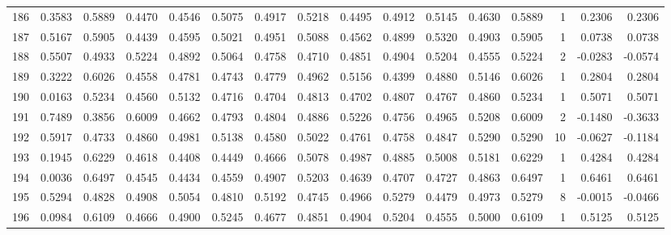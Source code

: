 \begin{tabular}{lrrrrrrrrrrrrrrr}
186 &      0.3583 &  0.5889 &  0.4470 &  0.4546 &  0.5075 &  0.4917 &  0.5218 &  0.4495 &  0.4912 &  0.5145 &   0.4630 &     0.5889 &      1 &                    0.2306 &                     0.2306 \\
187 &      0.5167 &  0.5905 &  0.4439 &  0.4595 &  0.5021 &  0.4951 &  0.5088 &  0.4562 &  0.4899 &  0.5320 &   0.4903 &     0.5905 &      1 &                    0.0738 &                     0.0738 \\
188 &      0.5507 &  0.4933 &  0.5224 &  0.4892 &  0.5064 &  0.4758 &  0.4710 &  0.4851 &  0.4904 &  0.5204 &   0.4555 &     0.5224 &      2 &                   -0.0283 &                    -0.0574 \\
189 &      0.3222 &  0.6026 &  0.4558 &  0.4781 &  0.4743 &  0.4779 &  0.4962 &  0.5156 &  0.4399 &  0.4880 &   0.5146 &     0.6026 &      1 &                    0.2804 &                     0.2804 \\
190 &      0.0163 &  0.5234 &  0.4560 &  0.5132 &  0.4716 &  0.4704 &  0.4813 &  0.4702 &  0.4807 &  0.4767 &   0.4860 &     0.5234 &      1 &                    0.5071 &                     0.5071 \\
191 &      0.7489 &  0.3856 &  0.6009 &  0.4662 &  0.4793 &  0.4804 &  0.4886 &  0.5226 &  0.4756 &  0.4965 &   0.5208 &     0.6009 &      2 &                   -0.1480 &                    -0.3633 \\
192 &      0.5917 &  0.4733 &  0.4860 &  0.4981 &  0.5138 &  0.4580 &  0.5022 &  0.4761 &  0.4758 &  0.4847 &   0.5290 &     0.5290 &     10 &                   -0.0627 &                    -0.1184 \\
193 &      0.1945 &  0.6229 &  0.4618 &  0.4408 &  0.4449 &  0.4666 &  0.5078 &  0.4987 &  0.4885 &  0.5008 &   0.5181 &     0.6229 &      1 &                    0.4284 &                     0.4284 \\
194 &      0.0036 &  0.6497 &  0.4545 &  0.4434 &  0.4559 &  0.4907 &  0.5203 &  0.4639 &  0.4707 &  0.4727 &   0.4863 &     0.6497 &      1 &                    0.6461 &                     0.6461 \\
195 &      0.5294 &  0.4828 &  0.4908 &  0.5054 &  0.4810 &  0.5192 &  0.4745 &  0.4966 &  0.5279 &  0.4479 &   0.4973 &     0.5279 &      8 &                   -0.0015 &                    -0.0466 \\
196 &      0.0984 &  0.6109 &  0.4666 &  0.4900 &  0.5245 &  0.4677 &  0.4851 &  0.4904 &  0.5204 &  0.4555 &   0.5000 &     0.6109 &      1 &                    0.5125 &                     0.5125 \\

\end{tabular}
